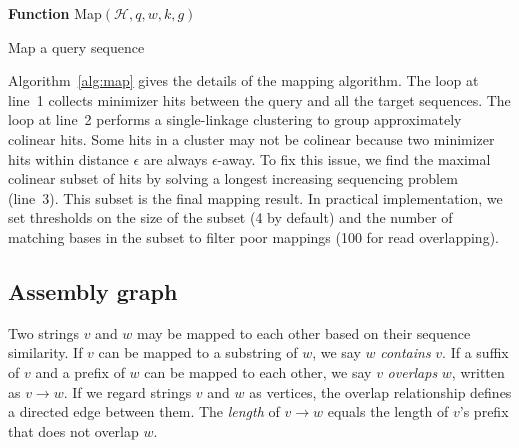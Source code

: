 \documentclass{bioinfo}
\begin{document}
\begin{methods}
\begin{algorithm}[tb]
\DontPrintSemicolon
\footnotesize
{}
\BlankLine
\textbf{Function} {\sc Map}$(\mathcal{H},q,w,k,g)$
\caption{Map a query sequence}\label{alg:map}
\end{algorithm}

Algorithm~\ref{alg:map} gives the details of the mapping algorithm. The loop at line~1
collects minimizer hits between the query and all the target sequences. The
loop at line~2 performs a single-linkage clustering to group approximately
colinear hits. Some hits in a cluster may not be colinear because two minimizer
hits within distance $\epsilon$ are always $\epsilon$-away. To fix this issue,
we find the maximal colinear subset of hits by solving a longest increasing
sequencing problem (line~3). This subset is the final mapping result. In
practical implementation, we set thresholds on the size of the subset (4 by
default) and the number of matching bases in the subset to filter poor mappings
(100 for read overlapping).

\subsection{Assembly graph}

Two strings $v$ and $w$ may be mapped to each other based on their sequence
similarity. If $v$ can be mapped to a substring of $w$, we say $w$
\emph{contains} $v$. If a suffix of $v$ and a prefix of $w$ can be mapped to
each other, we say $v$ \emph{overlaps} $w$, written as $v\to w$.
If we regard strings $v$ and $w$ as vertices, the overlap relationship defines
a directed edge between them. The \emph{length} of $v\to w$ equals the length
of $v$'s prefix that does not overlap $w$.


\end{methods}
\end{document}

